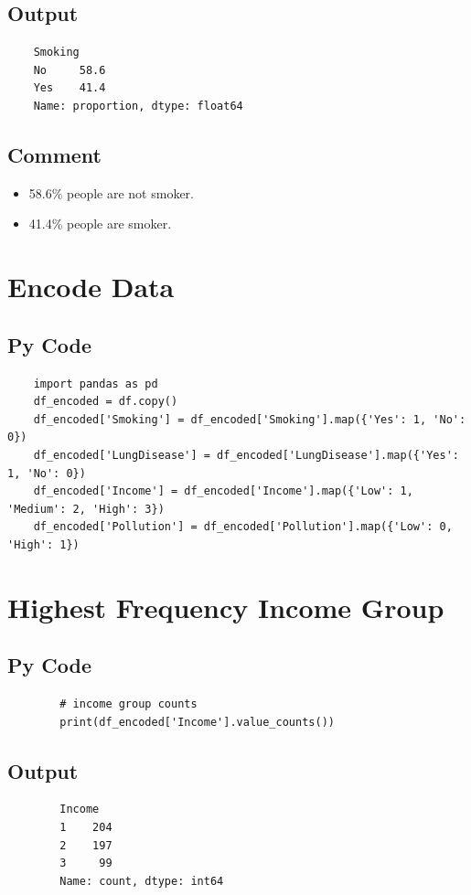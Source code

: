 \documentclass[a4paper,12pt]{article}
\begin{document}
\subsection{Output}
\begin{verbatim}
	Smoking
	No     58.6
	Yes    41.4
	Name: proportion, dtype: float64
\end{verbatim}

\subsection{Comment}
\begin{itemize}
	\item 58.6\% people are not smoker.
	\item 41.4\% people are smoker.
\end{itemize}

\section{Encode Data}

\subsection{Py Code}
\begin{lstlisting}
	import pandas as pd
	df_encoded = df.copy()
	df_encoded['Smoking'] = df_encoded['Smoking'].map({'Yes': 1, 'No': 0})
	df_encoded['LungDisease'] = df_encoded['LungDisease'].map({'Yes': 1, 'No': 0})
	df_encoded['Income'] = df_encoded['Income'].map({'Low': 1, 'Medium': 2, 'High': 3})
	df_encoded['Pollution'] = df_encoded['Pollution'].map({'Low': 0, 'High': 1})
\end{lstlisting}
	\section{Highest Frequency Income Group}
	
	\subsection{Py Code}
	\begin{lstlisting}
		# income group counts
		print(df_encoded['Income'].value_counts())
	\end{lstlisting}
	
	\subsection{Output}
	\begin{verbatim}
		Income
		1    204
		2    197
		3     99
		Name: count, dtype: int64
	\end{verbatim}
	
\end{document}
